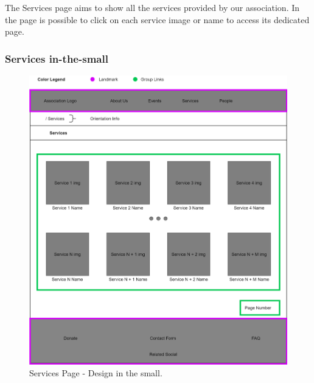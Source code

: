 The Services page aims to show all the services provided by our association. In the page is possible to click on each service image or name to access its dedicated page.

\subsubsection{Services in-the-small}
\begin{figure}[h!]
		\centering
		\begin{minipage}[b]{1\textwidth}
    			\includegraphics[width=\textwidth]{./assets/services.png}
			\caption{Services Page - Design in the small.}
		\end{minipage}
	\end{figure}
\FloatBarrier

\clearpage


